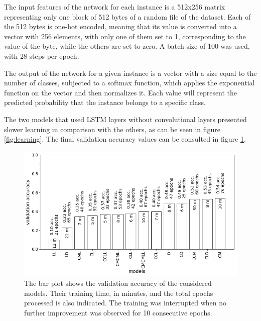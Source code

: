 The input features of the network for each instance is a 512x256 matrix representing only one block of 512 bytes of a random file of the dataset. Each of the 512 bytes is one-hot encoded, meaning that its value is converted into a vector with 256 elements, with only one of them set to 1, corresponding to the value of the byte, while the others are set to zero. A batch size of 100 was used, with 28 steps per epoch.


The output of the network for a given instance is a vector with a size equal to the number of classes, subjected to a softmax function, which applies the exponential function on the vector and then normalizes it. Each value will represent the predicted probability that the instance belongs to a specific class.

The two models that used LSTM layers without convolutional layers presented slower learning in comparison with the others, as can be seen in figure \ref{fig:learning}. The final validation accuracy values can be consulted in figure \ref{fig:models}.


\noindent
\begin{figure}[htb!]
\centering\includegraphics[width=1.0\textwidth]{content/models.png}
\caption[Validation accuracy of models]{\label{fig:models}The bar plot shows the validation accuracy of the considered models. Their training time, in minutes, and the total epochs processed is also indicated. The training was interrupted when no further improvement was observed for 10 consecutive epochs.}%
\end{figure}


